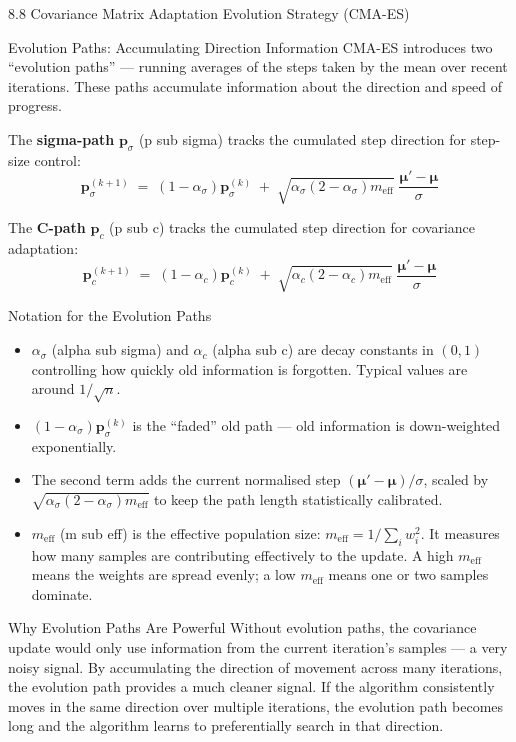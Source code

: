\documentclass[aspectratio=169,10pt]{beamer}
\begin{document}
\begin{frame}[allowframebreaks]{8.8 Covariance Matrix Adaptation Evolution Strategy (CMA-ES)}
\begin{block}{Evolution Paths: Accumulating Direction Information}
CMA-ES introduces two ``evolution paths'' --- running averages of the steps taken by the mean over recent iterations. These paths accumulate information about the direction and speed of progress.

The \textbf{sigma-path} $\mathbf{p}_\sigma$ (p sub sigma) tracks the cumulated step direction for step-size control:
\[
  \mathbf{p}_\sigma^{(k+1)} \;=\; (1-\alpha_\sigma)\mathbf{p}_\sigma^{(k)}
    \;+\; \sqrt{\alpha_\sigma(2-\alpha_\sigma)m_\text{eff}}\;\frac{\bm{\mu}'-\bm{\mu}}{\sigma}
\]

The \textbf{C-path} $\mathbf{p}_c$ (p sub c) tracks the cumulated step direction for covariance adaptation:
\[
  \mathbf{p}_c^{(k+1)} \;=\; (1-\alpha_c)\mathbf{p}_c^{(k)}
    \;+\; \sqrt{\alpha_c(2-\alpha_c)m_\text{eff}}\;\frac{\bm{\mu}'-\bm{\mu}}{\sigma}
\]
\end{block}

\begin{block}{Notation for the Evolution Paths}
\begin{itemize}
  \item $\alpha_\sigma$ (alpha sub sigma) and $\alpha_c$ (alpha sub c) are decay constants in $(0,1)$ controlling how quickly old information is forgotten. Typical values are around $1/\sqrt{n}$.
  \item $(1-\alpha_\sigma)\mathbf{p}_\sigma^{(k)}$ is the ``faded'' old path --- old information is down-weighted exponentially.
  \item The second term adds the current normalised step $(\bm{\mu}' - \bm{\mu})/\sigma$, scaled by $\sqrt{\alpha_\sigma(2-\alpha_\sigma)m_\text{eff}}$ to keep the path length statistically calibrated.
  \item $m_\text{eff}$ (m sub eff) is the effective population size: $m_\text{eff} = 1/\sum_i w_i^2$. It measures how many samples are contributing effectively to the update. A high $m_\text{eff}$ means the weights are spread evenly; a low $m_\text{eff}$ means one or two samples dominate.
\end{itemize}
\end{block}

\begin{alertblock}{Why Evolution Paths Are Powerful}
Without evolution paths, the covariance update would only use information from the current iteration's samples --- a very noisy signal. By accumulating the direction of movement across many iterations, the evolution path provides a much cleaner signal. If the algorithm consistently moves in the same direction over multiple iterations, the evolution path becomes long and the algorithm learns to preferentially search in that direction.
\end{alertblock}


\end{frame}
\end{document}
